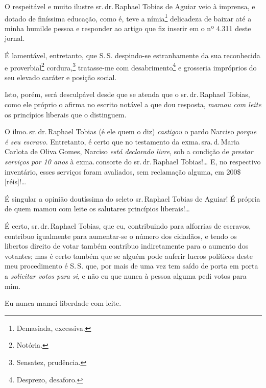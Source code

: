 O respeitável e muito ilustre sr.\,dr.\,Raphael Tobias de Aguiar veio à
imprensa, e dotado de finíssima educação, como é, teve a
nímia\footnote{ Demasiada, excessiva.} delicadeza de baixar até a
minha humilde pessoa e responder ao artigo que fiz inserir em o nº 4.311
deste jornal.

É lamentável, entretanto, que S.\,S. despindo-se estranhamente da sua
reconhecida e proverbial\footnote{ Notória.} cordura,\footnote{
  Sensatez, prudência.} tratasse-me com desabrimento\footnote{
  Desprezo, desaforo.} e grosseria impróprios do seu elevado caráter e
posição social.

Isto, porém, será desculpável desde que se atenda que o sr.\,dr.\,Raphael
Tobias, como ele próprio o afirma no escrito notável a que dou resposta,
\emph{mamou com leite} os princípios liberais que o distinguem.

O ilmo.\,sr.\,dr.\,Raphael Tobias (é ele quem o diz) \emph{castigou} o
pardo Narciso \emph{porque é seu escravo}. Entretanto, é certo que no
testamento da exma.\,sra.\,d.\,Maria Carlota de Oliva Gomes, Narciso
\emph{está declarado livre}, sob a condição de \emph{prestar serviços}
\emph{por 10 anos} à exma.\,consorte do sr.\,dr.\,Raphael Tobias!\ldots{} E, no
respectivo inventário, esses serviços foram avaliados, sem reclamação
alguma, em 200\$ {[}réis{]}!\ldots{}

É singular a opinião doutíssima do seleto sr.\,Raphael Tobias de Aguiar!
É própria de quem mamou com leite os salutares princípios
liberais!\ldots{}

É certo, sr.\,dr.\,Raphael Tobias, que eu, contribuindo para alforrias de
escravos, contribuo igualmente para aumentar-se o número dos cidadãos, e
tendo os libertos direito de votar também contribuo indiretamente para o
aumento dos votantes; mas é certo também que se alguém pode auferir
lucros políticos deste meu procedimento é S.\,S. que, por mais de uma vez
tem saído de porta em porta a \emph{solicitar votos para si}, e não eu
que nunca à pessoa alguma pedi votos para mim.

Eu nunca mamei liberdade com leite.

